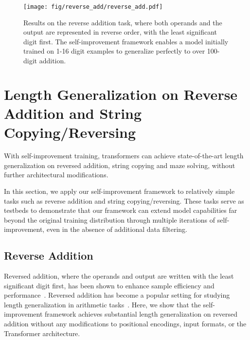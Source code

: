 \begin{figure}
    \centering
    \texttt{[image: fig/reverse\_add/reverse\_add.pdf]}
    \caption{Results on the reverse addition task, where both operands and the output are represented in reverse order, with the least significant digit first. The self-improvement framework enables a model initially trained on 1-16 digit examples to generalize perfectly to over 100-digit addition. }
    \label{fig:result_reverse_add}
\end{figure}



\section{Length Generalization on Reverse Addition and String Copying/Reversing}\label{sec:addition}
\begin{finding}
    With self-improvement training, transformers can achieve state-of-the-art length generalization on reversed addition, string copying and maze solving, without further architectural modifications.
\end{finding}


In this section, we apply our self-improvement framework to relatively simple tasks such as reverse addition and string copying/reversing. These tasks serve as testbeds to demonstrate that our framework can extend model capabilities far beyond the original training distribution through multiple iterations of self-improvement, even in the absence of additional data filtering.

\subsection{Reverse Addition}\label{sec:reverse_addition}


Reversed addition, where the operands and output are written with the least significant digit first, has been shown to enhance sample efficiency and performance~\citep{lee2023teaching}. Reversed addition has become a popular setting for studying length generalization in arithmetic tasks~\citep{lee2023teaching,shen2023positional,zhou2023algorithms,zhou2024transformers,Cho2024PositionCI,mcleish2024transformers}. 
Here, we show that the self-improvement framework achieves substantial length generalization on reversed addition without any modifications to positional encodings, input formats, or the Transformer architecture.

